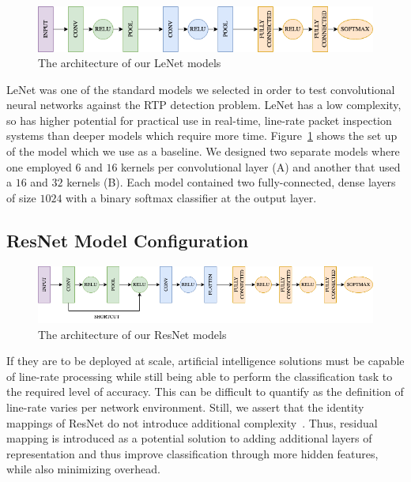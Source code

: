 \begin{figure} [ht!]
\includegraphics[width=\linewidth]{chapters/5/img/lenet.drawio.png}
\caption{The architecture of our LeNet models}
\label{fig:lenet}
\end{figure}

LeNet was one of the standard models we selected in order to test convolutional neural networks against the RTP detection problem. LeNet has a low complexity, so has higher potential for practical use in real-time, line-rate packet inspection systems than deeper models which require more time. Figure~\ref{fig:lenet} shows the set up of the model which we use as a baseline. We designed two separate models where one employed $6$ and $16$ kernels per convolutional layer (A) and another that used a $16$ and $32$ kernels (B). Each model contained two fully-connected, dense layers of size $1024$ with a binary softmax classifier at the output layer.

\subsection{ResNet Model Configuration}

\begin{figure} [ht!]
\includegraphics[width=\linewidth]{chapters/5/img/resnet.drawio.png}
\caption{The architecture of our ResNet models}
\label{fig:resnet}
\end{figure}

If they are to be deployed at scale, artificial intelligence solutions must be capable of line-rate processing while still being able to perform the classification task to the required level of accuracy. This can be difficult to quantify as the definition of line-rate varies per network environment. Still, we assert that the identity mappings of ResNet do not introduce additional complexity~\cite{resnet}. Thus, residual mapping is introduced as a potential solution to adding additional layers of representation and thus improve classification through more hidden features, while also minimizing overhead.

